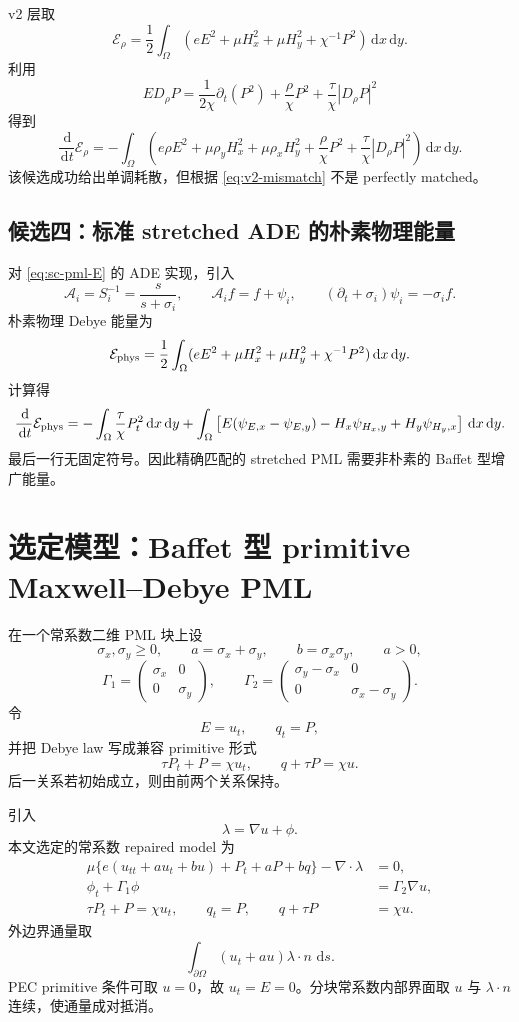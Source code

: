 \documentclass[UTF8,a4paper,11pt]{ctexart}
\newcommand{\dd}{\,\mathrm d}
\newcommand{\Om}{\Omega}
\newcommand{\sx}{\sigma_x}
\newcommand{\sy}{\sigma_y}
\newcommand{\Ecal}{\mathcal E}
\begin{document}
v2 层取
\[
\Ecal_\rho=\frac12\int_\Om
\left(eE^2+\mu H_x^2+\mu H_y^2+\chi^{-1}P^2\right)\dd x\dd y .
\]
利用
\[
E D_\rho P
=\frac1{2\chi}\partial_t(P^2)+\frac{\rho}{\chi}P^2
+\frac{\tau}{\chi}|D_\rho P|^2
\]
得到
\[
\frac{\dd}{\dd t}\Ecal_\rho
=-\int_\Om\left(
e\rho E^2+\mu\rho_yH_x^2+\mu\rho_xH_y^2
+\frac{\rho}{\chi}P^2+\frac{\tau}{\chi}|D_\rho P|^2
\right)\dd x\dd y.
\]
该候选成功给出单调耗散，但根据 \eqref{eq:v2-mismatch} 不是 perfectly matched。

\subsection{候选四：标准 stretched ADE 的朴素物理能量}

对 \eqref{eq:sc-pml-E} 的 ADE 实现，引入
\[
\mathcal A_i=S_i^{-1}=\frac{s}{s+\sigma_i},\qquad
\mathcal A_i f=f+\psi_i,\qquad
(\partial_t+\sigma_i)\psi_i=-\sigma_i f.
\]
朴素物理 Debye 能量为
\[
\Ecal_{\rm phys}=\frac12\int_\Om(eE^2+\mu H_x^2+\mu H_y^2+\chi^{-1}P^2)\dd x\dd y.
\]
计算得
\[
\frac{\dd}{\dd t}\Ecal_{\rm phys}
=-\int_\Om\frac{\tau}{\chi}P_t^2\dd x\dd y
+\int_\Om\left[
E(\psi_{E,x}-\psi_{E,y})-H_x\psi_{H_x,y}
+H_y\psi_{H_y,x}\right]\dd x\dd y.
\]
最后一行无固定符号。因此精确匹配的 stretched PML 需要非朴素的
Baffet 型增广能量。

\section{选定模型：Baffet 型 primitive Maxwell--Debye PML}

在一个常系数二维 PML 块上设
\[
\sx,\sy\ge0,\qquad a=\sx+\sy,\qquad b=\sx\sy,\qquad a>0,
\]
\[
\Gamma_1=\begin{pmatrix}\sx&0\\0&\sy\end{pmatrix},\qquad
\Gamma_2=\begin{pmatrix}\sy-\sx&0\\0&\sx-\sy\end{pmatrix}.
\]
令
\[
E=u_t,\qquad q_t=P,
\]
并把 Debye law 写成兼容 primitive 形式
\[
\tau P_t+P=\chi u_t,\qquad q+\tau P=\chi u.
\]
后一关系若初始成立，则由前两个关系保持。

引入
\[
\lambda=\nabla u+\phi.
\]
本文选定的常系数 repaired model 为
\begin{align}
\mu\{e(u_{tt}+a u_t+b u)+P_t+aP+bq\}-\nabla\cdot\lambda&=0,
\label{eq:bd-main}\\
\phi_t+\Gamma_1\phi&=\Gamma_2\nabla u,
\label{eq:bd-phi}\\
\tau P_t+P=\chi u_t,\qquad q_t=P,\qquad q+\tau P&=\chi u.
\label{eq:bd-debye}
\end{align}
外边界通量取
\[
\int_{\partial\Omega}(u_t+a u)\lambda\cdot n\,\dd s.
\]
PEC primitive 条件可取 \(u=0\)，故 \(u_t=E=0\)。分块常系数内部界面取
\(u\) 与 \(\lambda\cdot n\) 连续，使通量成对抵消。
\end{document}
